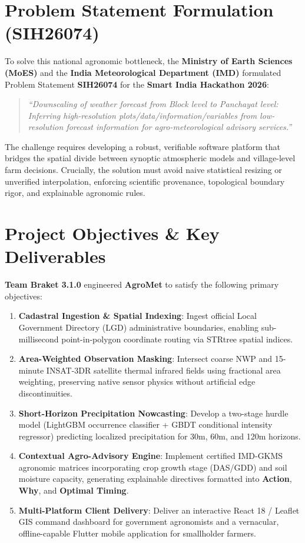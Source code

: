 \documentclass[11pt,a4paper,oneside]{report}
\begin{document}
\section{Problem Statement Formulation (SIH26074)}
To solve this national agronomic bottleneck, the \textbf{Ministry of Earth Sciences (MoES)} and the \textbf{India Meteorological Department (IMD)} formulated Problem Statement \textbf{SIH26074} for the \textbf{Smart India Hackathon 2026}:
\begin{quote}
\textit{“Downscaling of weather forecast from Block level to Panchayat level: Inferring high-resolution plots/data/information/variables from low-resolution forecast information for agro-meteorological advisory services.”}
\end{quote}

The challenge requires developing a robust, verifiable software platform that bridges the spatial divide between synoptic atmospheric models and village-level farm decisions. Crucially, the solution must avoid naive statistical resizing or unverified interpolation, enforcing scientific provenance, topological boundary rigor, and explainable agronomic rules.

\section{Project Objectives \& Key Deliverables}
\textbf{Team Braket 3.1.0} engineered \textbf{AgroMet} to satisfy the following primary objectives:
\begin{enumerate}[leftmargin=*]
    \item \textbf{Cadastral Ingestion \& Spatial Indexing}: Ingest official Local Government Directory (LGD) administrative boundaries, enabling sub-millisecond point-in-polygon coordinate routing via STRtree spatial indices.
    \item \textbf{Area-Weighted Observation Masking}: Intersect coarse NWP and 15-minute INSAT-3DR satellite thermal infrared fields using fractional area weighting, preserving native sensor physics without artificial edge discontinuities.
    \item \textbf{Short-Horizon Precipitation Nowcasting}: Develop a two-stage hurdle model (LightGBM occurrence classifier + GBDT conditional intensity regressor) predicting localized precipitation for 30m, 60m, and 120m horizons.
    \item \textbf{Contextual Agro-Advisory Engine}: Implement certified IMD-GKMS agronomic matrices incorporating crop growth stage (DAS/GDD) and soil moisture capacity, generating explainable directives formatted into \textbf{Action}, \textbf{Why}, and \textbf{Optimal Timing}.
    \item \textbf{Multi-Platform Client Delivery}: Deliver an interactive React 18 / Leaflet GIS command dashboard for government agronomists and a vernacular, offline-capable Flutter mobile application for smallholder farmers.
\end{enumerate}
\end{document}

